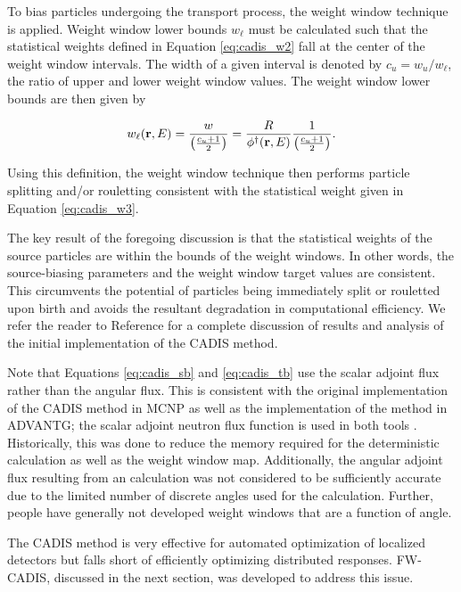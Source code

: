 To bias particles undergoing the transport process, the weight window technique is 
applied. Weight window lower bounds $w_{\ell}$ must be calculated such that the
statistical weights defined in Equation \ref{eq:cadis_w2} fall at the center of the
weight window intervals. The width of a given interval is denoted by 
$c_u = w_u/w_{\ell}$, the ratio of upper and lower weight window values. The
weight window lower bounds are then given by

\begin{equation}
w_{\ell}(\textbf{r},E) = \frac{w}{\left(\frac{c_u +1}{2}\right)} 
= \frac{R}{\phi^{\dagger}(\textbf{r},E)}\frac{1}{\left(\frac{c_u +1}{2}\right)}.
\label{eq:cadis_tb}
\end{equation}

\noindent Using this definition, the weight window technique then performs particle
splitting and/or rouletting consistent with the statistical weight given in Equation
\ref{eq:cadis_w3}.

The key result of the foregoing discussion is that the statistical weights of the
source particles are within the bounds of the weight windows. In other words, the
source-biasing parameters and the weight window target values are consistent. This
circumvents the potential of particles being immediately split or rouletted upon birth
and avoids the resultant degradation in computational efficiency. We refer the reader
to Reference \cite{cadis} for a complete discussion of results and analysis of the initial
implementation of the CADIS method.

Note that Equations \ref{eq:cadis_sb} and \ref{eq:cadis_tb} use the scalar adjoint 
flux rather than the angular flux. This is consistent with the
original implementation of the CADIS method in MCNP as well as the implementation of
the method in ADVANTG; the scalar adjoint neutron flux function is used in both tools
\cite{cadis, advantg}. Historically, this was done to reduce the memory required for
the deterministic calculation as well as the weight window map. Additionally, the 
angular adjoint flux resulting from an \sn calculation was not considered to be 
sufficiently accurate due to the limited number of discrete angles used for the 
calculation. Further, people have
generally not developed weight windows that are a function of angle.

The CADIS method is very effective for automated optimization of localized detectors
but falls short of efficiently optimizing distributed responses. FW-CADIS, discussed 
in the next section, was developed to address this issue.

